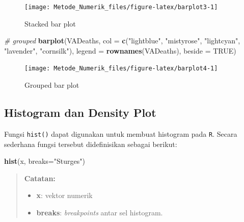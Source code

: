 \documentclass[]{book}
\newenvironment{Shaded}{\begin{snugshade}}{\end{snugshade}}
\newcommand{\CommentTok}[1]{\textcolor[rgb]{0.56,0.35,0.01}{\textit{#1}}}
\newcommand{\DataTypeTok}[1]{\textcolor[rgb]{0.13,0.29,0.53}{#1}}
\newcommand{\KeywordTok}[1]{\textcolor[rgb]{0.13,0.29,0.53}{\textbf{#1}}}
\newcommand{\NormalTok}[1]{#1}
\newcommand{\OtherTok}[1]{\textcolor[rgb]{0.56,0.35,0.01}{#1}}
\newcommand{\StringTok}[1]{\textcolor[rgb]{0.31,0.60,0.02}{#1}}
\providecommand{\tightlist}{%
  \setlength{\itemsep}{0pt}\setlength{\parskip}{0pt}}
\theoremstyle{definition}
\theoremstyle{definition}
\theoremstyle{definition}
\theoremstyle{remark}
\begin{document}
\begin{figure}

{\centering \texttt{[image: Metode\_Numerik\_files/figure-latex/barplot3-1]} 

}

\caption{Stacked bar plot}\label{fig:barplot3}
\end{figure}

\begin{Shaded}
\begin{Highlighting}[]
\CommentTok{# grouped}
\KeywordTok{barplot}\NormalTok{(VADeaths,}
         \DataTypeTok{col =} \KeywordTok{c}\NormalTok{(}\StringTok{"lightblue"}\NormalTok{, }\StringTok{"mistyrose"}\NormalTok{, }\StringTok{"lightcyan"}\NormalTok{, }
                 \StringTok{"lavender"}\NormalTok{, }\StringTok{"cornsilk"}\NormalTok{),}
        \DataTypeTok{legend =} \KeywordTok{rownames}\NormalTok{(VADeaths), }\DataTypeTok{beside =} \OtherTok{TRUE}\NormalTok{)}
\end{Highlighting}
\end{Shaded}

\begin{figure}

{\centering \texttt{[image: Metode\_Numerik\_files/figure-latex/barplot4-1]} 

}

\caption{Grouped bar plot}\label{fig:barplot4}
\end{figure}

\hypertarget{histogram}{%
\subsection{Histogram dan Density Plot}\label{histogram}}

Fungsi \texttt{hist()} dapat digunakan untuk membuat histogram pada \texttt{R}. Secara sederhana fungsi tersebut didefinisikan sebagai berikut:

\begin{Shaded}
\begin{Highlighting}[]
\KeywordTok{hist}\NormalTok{(x, }\DataTypeTok{breaks=}\StringTok{"Sturges"}\NormalTok{)}
\end{Highlighting}
\end{Shaded}

\begin{quote}
\textbf{Catatan: }

\begin{itemize}
\tightlist
\item
  \textbf{x}: vektor numerik
\item
  \textbf{breaks}: \emph{breakpoints} antar sel histogram.
\end{itemize}
\end{quote}
\end{document}
